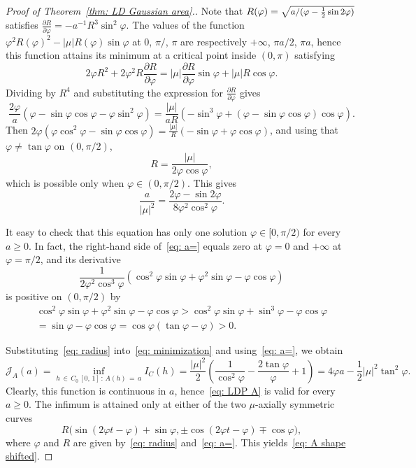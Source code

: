 \documentclass[10pt]{amsart}
\theoremstyle{definition}\newtheorem{defi}[theo]{Definition}\newtheorem{rema}[theo]{Remark}\newtheorem{exam}[theo]{Example}\newtheorem{exem}[theo]{Example}\newtheorem{nota}[theo]{Notation}
\newcommand{\Jcl}{\mathcal{J}}
\begin{document}
\begin{proof}[Proof of Theorem~\ref{thm: LD Gaussian area}.]
Note that $R(\varphi)=\sqrt{\text{\small{$a/(\varphi - \frac12 \sin 2 \varphi)$}}}$ satisfies $\frac{\partial R}{\partial \varphi} = -a^{-1} R^3 \sin^2 \varphi$. The values of the function $\varphi^2 R(\varphi)^2 - |\mu| R(\varphi) \sin \varphi$ at $0$, $\pi/$, $\pi$ are respectively $+\infty$, $\pi a/2$, $\pi a$, hence this function attains its minimum at a critical point inside $(0, \pi)$ satisfying
\[
2 \varphi R^2 + 2 \varphi^2 R \frac{\partial R}{\partial \varphi} = |\mu| \frac{\partial R}{\partial \varphi} \sin \varphi + |\mu| R \cos \varphi.
\]
Dividing by $R^4$ and substituting the expression for $\frac{\partial R}{\partial \varphi}$ gives
\[
\frac{2 \varphi}{a}\left(\varphi - \sin \varphi \cos \varphi - \varphi \sin^2 \varphi\right) = \frac{|\mu|}{a R} \left(- \sin^3 \varphi + \left(\varphi - \sin \varphi \cos \varphi\right)\cos \varphi\right).
\]
Then $2 \varphi(\varphi \cos^2 \varphi - \sin \varphi \cos \varphi) = \frac{|\mu|}{R} (- \sin \varphi + \varphi \cos \varphi)$, and using that $\varphi \neq \tan \varphi $ on $(0, \pi/2)$,
\begin{equation}\label{eq: radius}
R = \frac{|\mu|}{2 \varphi \cos \varphi},
\end{equation}
which is possible only when $\varphi \in (0, \pi/2)$. This gives
\begin{equation}\label{eq: a=}
\frac{a}{|\mu|^2} = \frac{2\varphi - \sin 2 \varphi}{8 \varphi^2 \cos^2 \varphi}.
\end{equation}

It easy to check that this equation has only one solution $\varphi \in [0, \pi/2)$ for every $a\ge 0$. In fact, the right-hand side of~\eqref{eq: a=} equals zero at $\varphi =0$ and $+\infty$ at $\varphi = \pi/2$, and its derivative
\[
\frac{1}{2\varphi^2 \cos^3\varphi} \left(
\cos^2 \varphi \sin \varphi + \varphi^2\sin \varphi - \varphi \cos \varphi
\right)
\]
is positive on $ (0, \pi/2)$ by
\begin{multline*}
\cos^2 \varphi \sin \varphi + \varphi^2\sin \varphi - \varphi \cos \varphi>
\cos^2 \varphi \sin \varphi + \sin^3 \varphi - \varphi \cos \varphi\\
=\sin \varphi -\varphi \cos \varphi=
\cos \varphi (\tan \varphi - \varphi)>0.
\end{multline*}

Substituting~\eqref{eq: radius} into~\eqref{eq: minimization} and using~\eqref{eq: a=}, we obtain
\[
\Jcl_A(a) = \inf_{h\,\in\,C_0\,[0,\,1]\,:\,A(h)\,=\,a} I_C(h) = \frac{|\mu|^2}{2} \left(\frac{1}{\cos^2 \varphi} - \frac{2 \tan \varphi}{\varphi} + 1 \right) = 4 \varphi a -\frac12 |\mu|^2 \tan^2 \varphi.
\]
Clearly, this function is continuous in $a$, hence~\eqref{eq: LDP A} is valid for every $a \ge 0$. The infimum is attained only at either of the two $\mu$-axially symmetric curves
\[
R \big(\sin(2 \varphi t - \varphi) + \sin \varphi,\pm \cos(2 \varphi t - \varphi) \mp \cos \varphi \big),
\]
where $\varphi$ and $R$ are given by~\eqref{eq: radius} and~\eqref{eq: a=}. This yields~\eqref{eq: A shape shifted}.
\end{proof}
\end{document}
